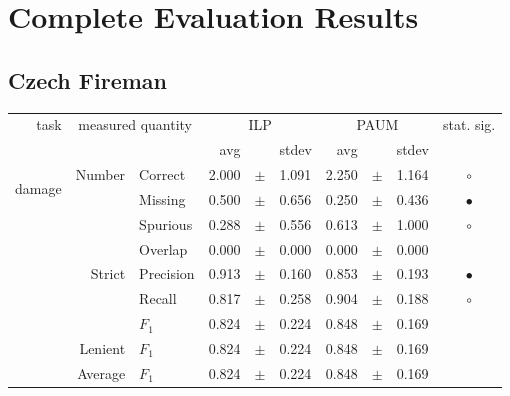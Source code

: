 \chapter{Complete Evaluation Results}

\section{Czech Fireman}

\begin{longtable}{|r|r|l||rcl|rcl|c|}
\hline
\multirow{2}{*}{task} & \multicolumn{2}{|c||}{\multirow{2}{*}{measured quantity}} & \multicolumn{3}{|c|}{ILP} & \multicolumn{3}{|c|}{PAUM} & \multirow{2}{*}{ stat. sig.}\\
\cline{4-9}
  & \multicolumn{2}{|c||}{} &  avg  &    &  stdev  &  avg  &    &  stdev  & \\
\hline
\endhead
\hline
\hline
\multirow{11}{*}{\begin{sideways}damage\end{sideways} }
             & \multirow{4}{*}{    Number} &         Correct &       2.000 &  $\pm$  &       1.091 &       2.250 &  $\pm$  &       1.164 & $\circ$ \\
\cline{3-10} &                             &         Missing &       0.500 &  $\pm$  &       0.656 &       0.250 &  $\pm$  &       0.436 & $\bullet$ \\
\cline{3-10} &                             &        Spurious &       0.288 &  $\pm$  &       0.556 &       0.613 &  $\pm$  &       1.000 & $\circ$ \\
\cline{3-10} &                             &         Overlap &       0.000 &  $\pm$  &       0.000 &       0.000 &  $\pm$  &       0.000 &  \\
\cline{2-10} & \multirow{3}{*}{    Strict} &       Precision &       0.913 &  $\pm$  &       0.160 &       0.853 &  $\pm$  &       0.193 & $\bullet$ \\
\cline{3-10} &                             &          Recall &       0.817 &  $\pm$  &       0.258 &       0.904 &  $\pm$  &       0.188 & $\circ$ \\
\cline{3-10} &                             &           $F_1$ &       0.824 &  $\pm$  &       0.224 &       0.848 &  $\pm$  &       0.169 &  \\
\cline{2-10} &                     Lenient &           $F_1$ &       0.824 &  $\pm$  &       0.224 &       0.848 &  $\pm$  &       0.169 &  \\
\cline{2-10} &                     Average &           $F_1$ &       0.824 &  $\pm$  &       0.224 &       0.848 &  $\pm$  &       0.169 &  \\

\end{longtable}
